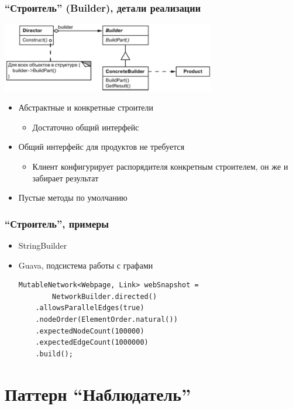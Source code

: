 \documentclass{../../slides-style}
\begin{document}
    \begin{frame}
        \frametitle{``Строитель'' (Builder), детали реализации}
        \begin{center}
            \includegraphics[width=0.7\textwidth]{builder.png}
        \end{center}
        \begin{itemize}
            \item Абстрактные и конкретные строители
            \begin{itemize}
                \item Достаточно общий интерфейс
            \end{itemize}
            \item Общий интерфейс для продуктов не требуется
            \begin{itemize}
                \item Клиент конфигурирует распорядителя конкретным строителем, он же и забирает результат
            \end{itemize}
            \item Пустые методы по умолчанию
        \end{itemize}
    \end{frame}

    \begin{frame}[fragile]
        \frametitle{``Строитель'', примеры}
        \begin{itemize}
            \item StringBuilder
            \item Guava, подсистема работы с графами
            \begin{verbatim}
MutableNetwork<Webpage, Link> webSnapshot = 
        NetworkBuilder.directed()
    .allowsParallelEdges(true)
    .nodeOrder(ElementOrder.natural())
    .expectedNodeCount(100000)
    .expectedEdgeCount(1000000)
    .build();
            \end{verbatim}
        \end{itemize}
    \end{frame}

    \section{Паттерн ``Наблюдатель''}
\end{document}
